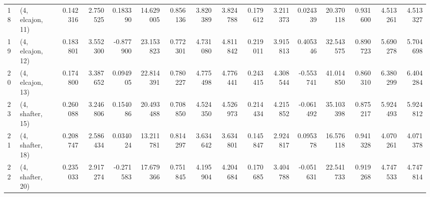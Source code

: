 \begin{tabular}{llrrrrrrrrrrrrrr}
18 &  (4, elcajon, 11) &   0.142316 &  2.750525 &  0.183390 &   14.629005 &  0.856136 &   3.820389 &   3.824788 &  0.179612 &  3.211373 &  0.024339 &   20.370118 &  0.931600 &   4.513261 &   4.513327 \\
19 &  (4, elcajon, 12) &   0.183801 &  3.552300 & -0.877900 &   23.153823 &  0.772301 &   4.731080 &   4.811842 &  0.219011 &  3.915813 &  0.405346 &   32.543575 &  0.890723 &   5.690278 &   5.704698 \\
20 &  (4, elcajon, 13) &   0.174800 &  3.387652 &  0.094905 &   22.814391 &  0.780227 &   4.775498 &   4.776441 &  0.243415 &  4.308544 & -0.553741 &   41.014850 &  0.860310 &   6.380299 &   6.404284 \\
23 &  (4, shafter, 15) &   0.260088 &  3.246806 &  0.154086 &   20.493488 &  0.708850 &   4.524350 &   4.526973 &  0.214434 &  4.215852 & -0.061492 &   35.103398 &  0.875217 &   5.924493 &   5.924812 \\
21 &  (4, shafter, 18) &   0.208747 &  2.586434 &  0.034024 &   13.211781 &  0.814297 &   3.634642 &   3.634801 &  0.145847 &  2.924817 &  0.095378 &   16.576118 &  0.941328 &   4.070261 &   4.071378 \\
22 &  (4, shafter, 20) &   0.235033 &  2.917274 & -0.271583 &   17.679366 &  0.751845 &   4.195904 &   4.204684 &  0.170685 &  3.404788 & -0.051631 &   22.541733 &  0.919268 &   4.747533 &   4.747814 \\
\bottomrule
\end{tabular}
